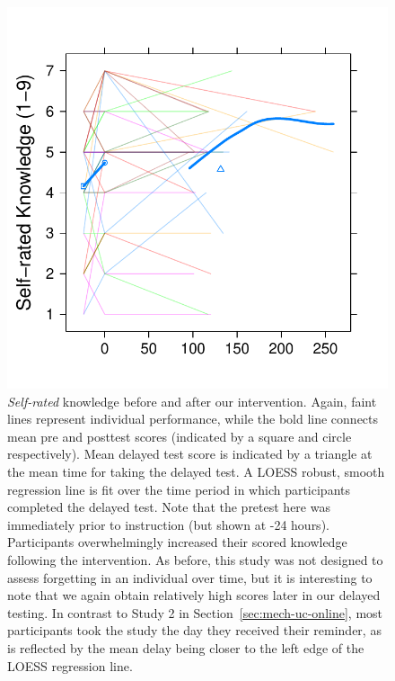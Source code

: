 \begin{figure}
    \centering
    \includegraphics{CCO-mech-self.pdf}
    \caption{\emph{Self-rated} knowledge before and after our intervention. Again,
        faint lines represent individual performance, while the bold line
        connects mean pre and posttest scores (indicated by a square and circle
        respectively).  Mean delayed test score is indicated by a triangle at
        the mean time for taking the delayed test. A LOESS robust, smooth
        regression line is fit over the time period in which participants
        completed the delayed test.  Note that the pretest here was immediately
        prior to instruction (but shown at -24 hours). Participants
        overwhelmingly increased their scored knowledge following the
        intervention. As before, this study was not designed to assess
        forgetting in an individual over time, but it is interesting to note
        that we again obtain relatively high scores later in our delayed
        testing. In contrast to Study 2 in Section~\ref{sec:mech-uc-online},
        most participants took the study the day they received their reminder,
        as is reflected by the mean delay being closer to the left edge of the
        LOESS regression line.}
    \label{fig:CCO-mech-self}
\end{figure}

